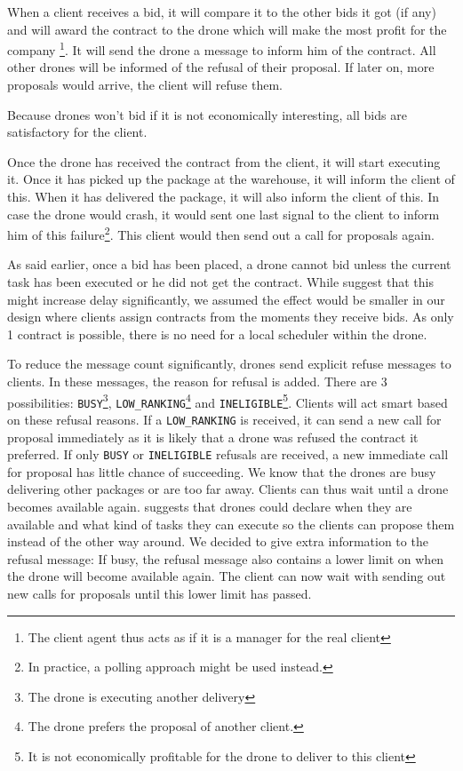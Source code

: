 \documentclass[10pt,a4paper,twocolumn]{article}
\begin{document}
When a client receives a bid, it will compare it to the other bids it got (if any) and will award the contract to the drone which will make the most profit for the company \footnote{The client agent thus acts as if it is a manager for the real client}. It will send the drone a message to inform him of the contract. All other drones will be informed of the refusal of their proposal. If later on, more proposals would arrive, the client will refuse them. 

Because drones won't bid if it is not economically interesting, all bids are satisfactory for the client.

Once the drone has received the contract from the client, it will start executing it. Once it has picked up the package at the warehouse, it will inform the client of this. When it has delivered the package, it will also inform the client of this. In case the drone would crash, it would sent one last signal to the client to inform him of this failure\footnote{In practice, a polling approach might be used instead.}. This client would then send out a call for proposals again.

As said earlier, once a bid has been placed, a drone cannot bid unless the current task has been executed or he did not get the contract. While \cite{CNET} suggest that this might increase delay significantly, we assumed the effect would be smaller in our design where clients assign contracts from the moments they receive bids. As only 1 contract is possible, there is no need for a local scheduler within the drone.

To reduce the message count significantly, drones send explicit refuse messages to clients. In these messages, the reason for refusal is added. There are 3 possibilities: \texttt{BUSY}\footnote{The drone is executing another delivery}, \texttt{LOW\_RANKING}\footnote{The drone prefers the proposal of another client.} and \texttt{INELIGIBLE}\footnote{It is not economically profitable for the drone to deliver to this client}. Clients will act smart based on these refusal reasons. If a \texttt{LOW\_RANKING} is received, it can send a new call for proposal immediately as it is likely that a drone was refused the contract it preferred. If only \texttt{BUSY} or \texttt{INELIGIBLE} refusals are received, a new immediate call for proposal has little chance of succeeding. We know that the drones are busy delivering other packages or are too far away. Clients can thus wait until a drone becomes available again. \cite{CNET} suggests that drones could declare when they are available and what kind of tasks they can execute so the clients can propose them instead of the other way around. We decided to give extra information to the refusal message: If busy, the refusal message also contains a lower limit on when the drone will become available again. The client can now wait with sending out new calls for proposals until this lower limit has passed.
\end{document}
